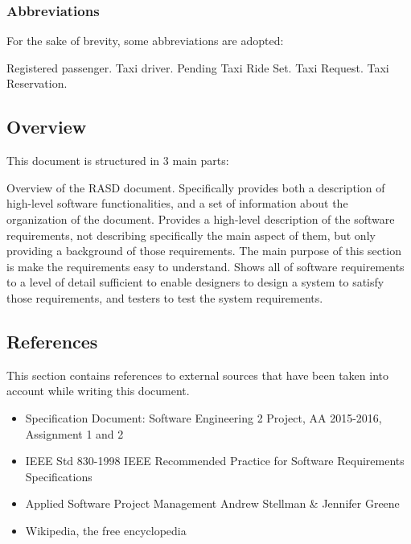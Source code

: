 \subsubsection{Abbreviations}
For the sake of brevity, some abbreviations are adopted:
\begin{itemize}
	 Registered passenger.
	 Taxi driver.
	 Pending Taxi Ride Set.
	 Taxi Request.
	 Taxi Reservation.
\end{itemize}	
\subsection{Overview}
This document is structured in 3 main parts:
\begin{itemize}
	 Overview of the RASD document. Specifically provides both a description of high-level software functionalities, and a set of information about the organization of the document.
	 Provides a high-level description of the software requirements, not describing specifically the main aspect of them, but only providing a background of those requirements. The main purpose of this section is make the requirements easy to understand.
	 Shows all of software requirements to a level of detail sufficient to enable designers to design a system to satisfy those requirements, and testers to test the system requirements.
\end{itemize}
\subsection{References}
This section contains references to external sources that have been taken into account while writing this document.
\begin{itemize}
	\item Specification Document: Software Engineering 2 Project, AA 2015-2016, Assignment 1 and 2
	\item IEEE Std 830-1998 IEEE Recommended Practice for Software Requirements Specifications
	\item Applied Software Project Management Andrew Stellman \& Jennifer Greene
	\item Wikipedia, the free encyclopedia
\end{itemize}